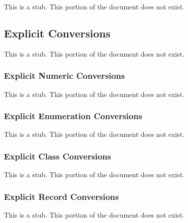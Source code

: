 This is a stub.  This portion of the document does not exist.

\subsection{Explicit Conversions}
\label{Explicit_Conversions}

This is a stub.  This portion of the document does not exist.

\subsubsection{Explicit Numeric Conversions}
\label{Explicit_Numeric_Conversions}

This is a stub.  This portion of the document does not exist.

\subsubsection{Explicit Enumeration Conversions}
\label{Explicit_Enumeration_Conversions}

This is a stub.  This portion of the document does not exist.

\subsubsection{Explicit Class Conversions}
\label{Explicit_Class_Conversions}

This is a stub.  This portion of the document does not exist.

\subsubsection{Explicit Record Conversions}
\label{Explicit_Record_Conversions}

This is a stub.  This portion of the document does not exist.
